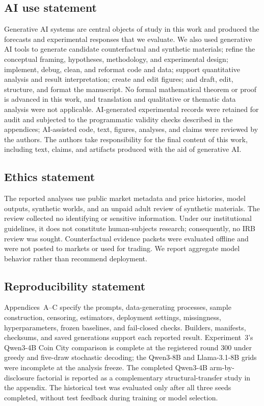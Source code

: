 \subsection*{AI use statement}

Generative AI systems are central objects of study in this work and produced the
forecasts and experimental responses that we evaluate. We also used generative AI
tools to generate candidate counterfactual and synthetic materials; refine the
conceptual framing, hypotheses, methodology, and experimental design; implement,
debug, clean, and reformat code and data; support quantitative analysis and result
interpretation; create and edit figures; and draft, edit, structure, and format the
manuscript. No formal mathematical theorem or proof is advanced in this work, and
translation and qualitative or thematic data analysis were not applicable.
AI-generated experimental records were retained for audit and subjected to the
programmatic validity checks described in the appendices; AI-assisted code, text,
figures, analyses, and claims were reviewed by the authors. The authors take
responsibility for the final content of this work, including text, claims, and
artifacts produced with the aid of generative AI.

\subsection*{Ethics statement}

The reported analyses use public market metadata and price histories, model
outputs, synthetic worlds, and an unpaid adult review of synthetic materials. The
review collected no identifying or sensitive information. Under our institutional
guidelines, it does not constitute human-subjects research; consequently, no IRB
review was sought. Counterfactual evidence packets were evaluated offline and were
not posted to markets or used for trading. We report aggregate model behavior
rather than recommend deployment.

\subsection*{Reproducibility statement}

Appendices~A--C specify the prompts, data-generating processes, sample construction,
censoring, estimators, deployment settings, missingness, hyperparameters, frozen
baselines, and fail-closed checks. Builders, manifests, checksums, and saved
generations support each reported result. Experiment~3's Qwen3-4B Coin City
comparison is complete at the registered round 300 under greedy and five-draw
stochastic decoding; the Qwen3-8B and Llama-3.1-8B grids were incomplete at the
analysis freeze. The completed Qwen3-4B arm-by-disclosure factorial is reported
as a complementary structural-transfer study in the appendix.
The historical test was evaluated only after all three seeds completed, without
test feedback during training or model selection.

